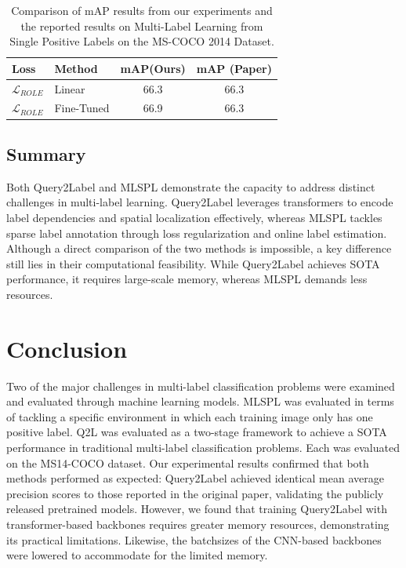 \documentclass[lettersize,journal]{IEEEtran}
\begin{document}
\begin{table}[H]
    \small
    \caption{Comparison of mAP results from our experiments and the reported results on Multi-Label Learning from Single Positive Labels on the MS-COCO 2014 Dataset.}
    \label{tab:MLSPL_map_comparison}
    \centering
    \begin{tabular}{l l c c}
    \toprule
    \textbf{Loss} & \textbf{Method} & \textbf{mAP(Ours)} & \textbf{mAP (Paper)} \\
    \midrule
    $\mathcal{L}_{ROLE}$ & Linear & 66.3 & 66.3 \\
    $\mathcal{L}_{ROLE}$ & Fine-Tuned & 66.9 & 66.3 \\
    \bottomrule
    \end{tabular}
\end{table}

\subsection{Summary}
Both Query2Label and MLSPL demonstrate the capacity to address distinct challenges in multi-label learning. Query2Label leverages transformers to encode label dependencies and spatial localization effectively, whereas MLSPL tackles sparse label annotation through loss regularization and online label estimation. Although a direct comparison of the two methods is impossible, a key difference still lies in their computational feasibility. While Query2Label achieves SOTA performance, it requires large-scale memory, whereas MLSPL demands less resources.



\section{Conclusion}
Two of the major challenges in multi-label classification problems were examined and evaluated through machine learning models. MLSPL was evaluated in terms of tackling a specific environment in which each training image only has one positive label. Q2L was evaluated as a two-stage framework to achieve a SOTA performance in traditional multi-label classification problems. Each was evaluated on the MS14-COCO dataset. 
Our experimental results confirmed that both methods performed as expected: Query2Label achieved identical mean average precision scores to those reported in the original paper, validating the publicly released pretrained models. However, we found that training Query2Label with transformer-based backbones requires greater memory resources, demonstrating its practical limitations. Likewise, the batchsizes of the CNN-based backbones were lowered to accommodate for the limited memory.
\end{document}
